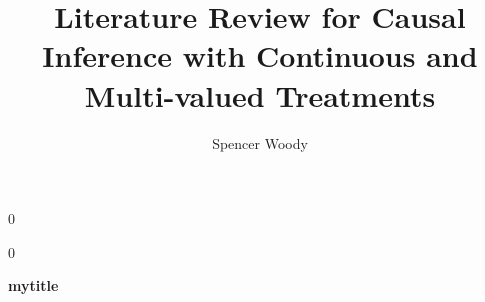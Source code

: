 \documentclass[12pt]{article}
\newcommand{\blind}{0}
\begin{document}
\def\spacingset#1{\renewcommand{\baselinestretch}%
{#1}\small\normalsize} \spacingset{1}



\newcommand{\mytitle}{Literature Review for Causal Inference with
  Continuous and Multi-valued Treatments}

\blind
{
  \title{\bf \mytitle}
  
  \author{Spencer Woody}
  
  






  \maketitle
} \fi

\blind
{
  \bigskip
  \bigskip
  \bigskip
  \begin{center}
    {\LARGE\bf mytitle}


    
\end{center}
  \medskip
} \fi





\spacingset{1.45} %
\end{document}
